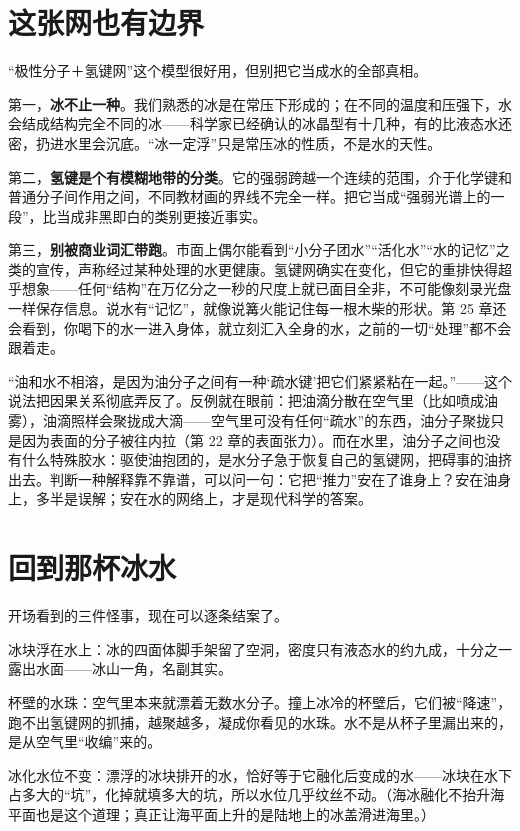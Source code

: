 \section{这张网也有边界}

“极性分子＋氢键网”这个模型很好用，但别把它当成水的全部真相。

第一，\textbf{冰不止一种}。我们熟悉的冰是在常压下形成的；在不同的温度和压强下，水会结成结构完全不同的冰——科学家已经确认的冰晶型有十几种，有的比液态水还密，扔进水里会沉底。“冰一定浮”只是常压冰的性质，不是水的天性。

第二，\textbf{氢键是个有模糊地带的分类}。它的强弱跨越一个连续的范围，介于化学键和普通分子间作用之间，不同教材画的界线不完全一样。把它当成“强弱光谱上的一段”，比当成非黑即白的类别更接近事实。

第三，\textbf{别被商业词汇带跑}。市面上偶尔能看到“小分子团水”“活化水”“水的记忆”之类的宣传，声称经过某种处理的水更健康。氢键网确实在变化，但它的重排快得超乎想象——任何“结构”在万亿分之一秒的尺度上就已面目全非，不可能像刻录光盘一样保存信息。说水有“记忆”，就像说篝火能记住每一根木柴的形状。第 25 章还会看到，你喝下的水一进入身体，就立刻汇入全身的水，之前的一切“处理”都不会跟着走。

\begin{wuqu}
“油和水不相溶，是因为油分子之间有一种‘疏水键’把它们紧紧粘在一起。”——这个说法把因果关系彻底弄反了。反例就在眼前：把油滴分散在空气里（比如喷成油雾），油滴照样会聚拢成大滴——空气里可没有任何“疏水”的东西，油分子聚拢只是因为表面的分子被往内拉（第 22 章的表面张力）。而在水里，油分子之间也没有什么特殊胶水：驱使油抱团的，是水分子急于恢复自己的氢键网，把碍事的油挤出去。判断一种解释靠不靠谱，可以问一句：它把“推力”安在了谁身上？安在油身上，多半是误解；安在水的网络上，才是现代科学的答案。
\end{wuqu}

\section{回到那杯冰水}

开场看到的三件怪事，现在可以逐条结案了。

冰块浮在水上：冰的四面体脚手架留了空洞，密度只有液态水的约九成，十分之一露出水面——冰山一角，名副其实。

杯壁的水珠：空气里本来就漂着无数水分子。撞上冰冷的杯壁后，它们被“降速”，跑不出氢键网的抓捕，越聚越多，凝成你看见的水珠。水不是从杯子里漏出来的，是从空气里“收编”来的。

冰化水位不变：漂浮的冰块排开的水，恰好等于它融化后变成的水——冰块在水下占多大的“坑”，化掉就填多大的坑，所以水位几乎纹丝不动。（海冰融化不抬升海平面也是这个道理；真正让海平面上升的是陆地上的冰盖滑进海里。）

